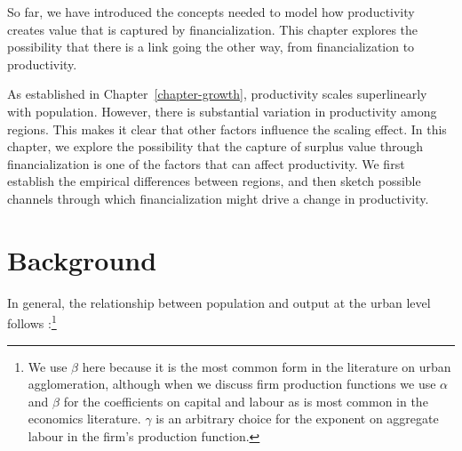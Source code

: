 






So far, we have introduced the concepts needed to model %
how productivity creates value that is captured by financialization. %
This chapter explores the possibility that there is a link going the other way, from financialization to productivity. 

As established in Chapter~\ref{chapter-growth}, productivity scales superlinearly with population. %
However, there is substantial variation in productivity among regions.  This makes it clear that other factors influence the scaling effect. In this chapter, we explore the possibility that the capture of surplus value through financialization is one of the factors that can affect  productivity. We first establish the empirical differences between regions, and then sketch possible channels through which financialization might drive a change in productivity. 


\section{Background}\label{sec-fig-residuals}

In general, the relationship between population and output at the urban level follows \cite{loboUrbanScalingProduction2013}:\footnote{We use $\beta$ here because it is the most common form in the literature on urban agglomeration, although when we discuss firm production functions we use $\alpha$ and $\beta$ for the coefficients on capital and labour %
as is most common in the economics literature. $\gamma$ is an arbitrary choice for the exponent on aggregate labour in the firm's production function.}


